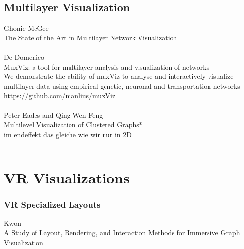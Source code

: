 \subsection{Multilayer Visualization}
Ghonie McGee\\
The State of the Art in Multilayer Network Visualization\\
\\
De Domenico\\
MuxViz: a tool for multilayer analysis and visualization of networks\\
We demonstrate the ability of muxViz to analyse and interactively visualize multilayer data using empirical genetic, neuronal and transportation networks https://github.com/manlius/muxViz\\
\\
Peter Eades and Qing-Wen Feng\\
Multilevel Visualization of Clustered Graphs*\\
im endeffekt das gleiche wie wir nur in 2D\\
\\

\section{VR Visualizations}

\subsubsection{VR Specialized Layouts}
Kwon\\
A Study of Layout, Rendering, and Interaction Methods for Immersive Graph Visualization\\

